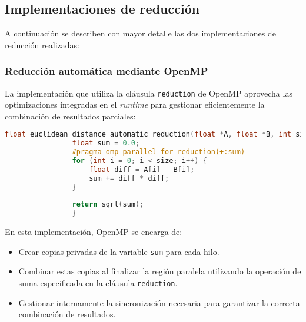    \subsection{Implementaciones de reducción}

        A continuación se describen con mayor detalle las dos implementaciones de reducción realizadas:

        \subsubsection{Reducción automática mediante OpenMP}

            La implementación que utiliza la cláusula \texttt{reduction} de OpenMP aprovecha las optimizaciones integradas en el \textit{runtime} para gestionar eficientemente la combinación de resultados parciales:

            \begin{lstlisting}[language=c, caption={Reducción automática utilizando la cláusula \texttt{reduction} de OpenMP.}, label=automatic_reduction_code, gobble=16]
                float euclidean_distance_automatic_reduction(float *A, float *B, int size) {
                float sum = 0.0;
                #pragma omp parallel for reduction(+:sum)
                for (int i = 0; i < size; i++) {
                    float diff = A[i] - B[i];
                    sum += diff * diff;
                }
                
                return sqrt(sum);
                }
            \end{lstlisting}
            
            En esta implementación, OpenMP se encarga de:
            
            \begin{itemize}
            
                \item Crear copias privadas de la variable \texttt{sum} para cada hilo.
                
                \item Combinar estas copias al finalizar la región paralela utilizando la operación de suma especificada en la cláusula \texttt{reduction}.
                
                \item Gestionar internamente la sincronización necesaria para garantizar la correcta combinación de resultados.
                
            \end{itemize}
            
